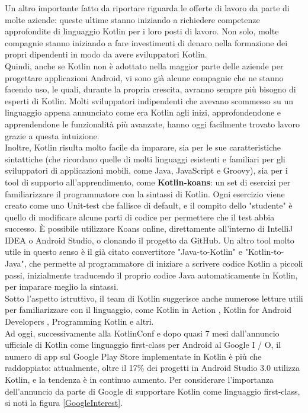 Un altro importante fatto da riportare riguarda le offerte di lavoro da parte di molte aziende: queste ultime stanno iniziando a richiedere competenze approfondite di linguaggio Kotlin per i loro posti di lavoro. Non solo, molte compagnie stanno iniziando a fare investimenti di denaro nella formazione dei propri dipendenti in modo da avere sviluppatori Kotlin.\\
Quindi, anche se Kotlin non è adottato nella maggior parte delle aziende per progettare applicazioni Android, vi sono già alcune compagnie che ne stanno facendo uso, le quali, durante la propria crescita, avranno sempre più bisogno di esperti di Kotlin. Molti sviluppatori indipendenti che avevano scommesso su un linguaggio appena annunciato come era Kotlin agli inizi, approfondendone e apprendendone le funzionalità più avanzate, hanno oggi facilmente trovato lavoro grazie a questa intuizione.\\

Inoltre, Kotlin risulta molto facile da imparare, sia per le sue caratteristiche sintattiche (che ricordano quelle di molti linguaggi esistenti e familiari per gli sviluppatori di applicazioni mobili, come Java, JavaScript e Groovy), sia per i tool di supporto all'apprendimento, come {\bfseries Kotlin-koans}: un set di esercizi per familiarizzare il programmatore con la sintassi di Kotlin. Ogni esercizio viene creato come uno Unit-test che fallisce di default, e il compito dello "studente" è quello di modificare alcune parti di codice per permettere che il test abbia successo. È possibile utilizzare Koans online, direttamente all'interno di IntelliJ IDEA o Android Studio, o clonando il progetto da GitHub. Un altro tool molto utile in questo senso è il già citato convertitore "Java-to-Kotlin" e "Kotlin-to-Java", che permette al programmatore di iniziare a scrivere codice Kotlin a piccoli passi, inizialmente traducendo il proprio codice Java automaticamente in Kotlin, per imparare meglio la sintassi.\\
Sotto l'aspetto istruttivo, il team di Kotlin suggerisce anche numerose letture utili per familiarizzare con il linguaggio, come
Kotlin in Action \cite{kaction}, Kotlin for Android Developers \cite{leiva}, Programming Kotlin \cite{programmingKotlin} e altri.\\

Ad oggi, successivamente alla KotlinConf e dopo quasi 7 mesi dall'annuncio ufficiale di Kotlin come linguaggio first-class per Android al Google I / O, il numero di app sul Google Play Store implementate in Kotlin è più che raddoppiato: attualmente, oltre il 17\% dei progetti in Android Studio 3.0 utilizza Kotlin, e la tendenza è in continuo aumento. Per considerare l'importanza dell'annuncio da parte di Google di supportare Kotlin come linguaggio first-class, si noti la figura \ref{GoogleInterest}.\\
\\
\\
\\

